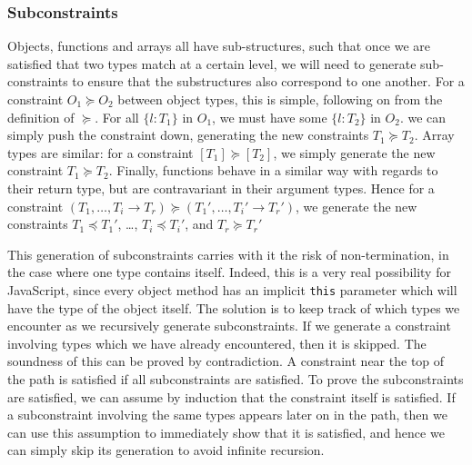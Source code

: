 \documentclass[12pt,a4paper,twoside,openright]{report}
\theoremstyle{definition}
\theoremstyle{dotless}
\newcommand*{\js}{\texttt}
\begin{document}

\subsubsection*{Subconstraints}
Objects, functions and arrays all have sub-structures, such that once we are
satisfied that two types match at a certain level, we will need to generate
sub-constraints to ensure that the substructures also correspond to one
another. For a constraint $O_1\succeq O_2$ between object types, this is
simple, following on from the definition of $\succeq$. For all $\{l:T_1\}$ in
$O_1$, we must have some $\{l:T_2\}$ in $O_2$. we can simply push the
constraint down, generating the new constraints $T_1\succeq T_2$. Array types
are similar: for a constraint $[T_1]\succeq[T_2]$, we simply generate the new
constraint $T_1\succeq T_2$. Finally, functions behave in a similar way with
regards to their return type, but are contravariant in their argument types.
Hence for a constraint $(T_1, \ldots, T_i \rightarrow T_r) \succeq(T_1',
\ldots, T_i' \rightarrow T_r')$, we generate the new constraints $T_1\preceq
T_1'$, \dots, $T_i\preceq T_i'$, and $T_r \succeq T_r'$

This generation of subconstraints carries with it the risk of non-termination,
in the case where one type contains itself. Indeed, this is a very real
possibility for JavaScript, since every object method has an implicit \js{this}
parameter which will have the type of the object itself. The solution is to
keep track of which types we encounter as we recursively generate
subconstraints. If we generate a constraint involving types which we have
already encountered, then it is skipped. The soundness of this can be proved by
contradiction. A constraint near the top of the path is satisfied if all
subconstraints are satisfied. To prove the subconstraints are satisfied, we can
assume by induction that the constraint itself is satisfied. If a subconstraint
involving the same types appears later on in the path, then we can use this
assumption to immediately show that it is satisfied, and hence we can simply
skip its generation to avoid infinite recursion.
\end{document}
